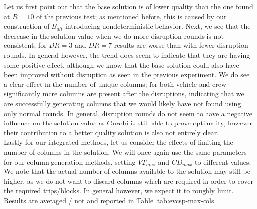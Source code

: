 \documentclass[]{article}
\begin{document}
Let us first point out that the base solution is of lower quality than the one found at $R=10$ of the previous test; as mentioned before, this is caused by our construction of $B_{alt}$ introducing nondeterministic behavior. Next, we see that the decrease in the solution value when we do more disruption rounds is not consistent; for $DR=3$ and $DR=7$ results are worse than with fewer disruption rounds. In general however, the trend does seem to indicate that they are having some positive effect, although we know that the base solution could also have been improved without disruption as seen in the previous experiment. We do see a clear effect in the number of unique columns; for both vehicle and crew significantly more columns are present after the disruptions, indicating that we are successfully generating columns that we would likely have not found using only normal rounds. In general, disruption rounds do not seem to have a negative influence on the solution value as Gurobi is still able to prove optimality, however their contribution to a better quality solution is also not entirely clear. \\

Lastly for our integrated methods, let us consider the effects of limiting the number of columns in the solution. We will once again use the same parameters for our column generation methods, setting $VT_{max}$ and $CD_{max}$ to different values. We note that the actual number of columns available to the solution may still be higher, as we do not want to discard columns which are required in order to cover the required trips/blocks. In general however, we expect it to roughly limit. Results are averaged / not  and reported in Table \ref{tab:evcsp-max-cols}.
\end{document}
